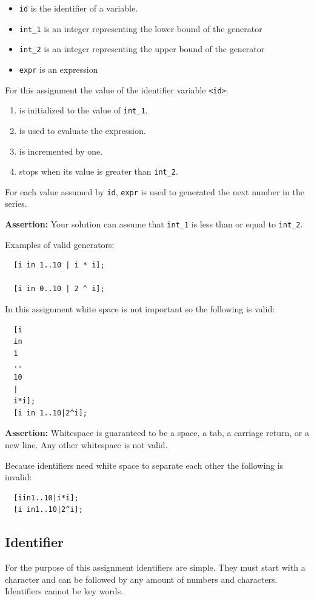 \documentclass{article}
\newcommand{\code}[1]{\texttt{\textmd{#1}}}
\begin{document}
\begin{itemize}
  \item \code{id} is the identifier of a variable.
  \item{\code{int\_1}} is an integer representing the lower bound of the generator
  \item{\code{int\_2}} is an integer representing the upper bound of the generator
  \item{\code{expr}} is an expression
\end{itemize}

For this assignment the value of the identifier variable \code{<id>}:
\begin{enumerate}
  \item is initialized to the value of \code{int\_1}.
  \item is used to evaluate the expression.
  \item is incremented by one.
  \item stops when its value is greater than \code{int\_2}.
\end{enumerate}
For each value assumed by \code{id}, \code{expr} is used to generated the next number in the
series.

\textbf{Assertion:} Your solution can assume that \code{int\_1} is less than or equal to
\code{int\_2}.

Examples of valid generators:
\begin{lstlisting}
  [i in 1..10 | i * i];

  [i in 0..10 | 2 ^ i];
\end{lstlisting}

In this assignment white space is not important so the following is valid:

\begin{lstlisting}
  [i
  in
  1
  ..
  10
  |
  i*i];
  [i in 1..10|2^i];
\end{lstlisting}
\textbf{Assertion:} Whitespace is guaranteed to be a space, a tab, a carriage return, or a new
line. Any other whitespace is not valid.

Because identifiers need white space to separate each other the following is invalid:
\begin{lstlisting}
  [iin1..10|i*i];
  [i in1..10|2^i];
\end{lstlisting}

\subsection{Identifier}
For the purpose of this assignment identifiers are simple. They must start with a character and
can be followed by any amount of numbers and characters. Identifiers cannot be key words.
\end{document}
